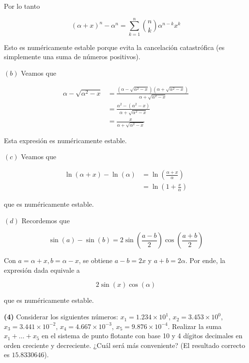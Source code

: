 \documentclass[12pt]{article}
\begin{document}
Por lo tanto 

\begin{equation*}
    (\alpha + x)^n - \alpha^n = \sum_{k=1}^{n} \binom{n}{k}\alpha^{n-k}x^k
\end{equation*}

Esto es numéricamente estable porque evita la cancelación catastrófica (es
simplemente una suma de números positivos).

$(b)$ Veamos que 

\begin{align*}
    \alpha - \sqrt{\alpha^2 - x}  
    &= \frac{( \alpha - \sqrt{\alpha^2 - x} )(\alpha + \sqrt{\alpha^2 - x})
    }{\alpha + \sqrt{\alpha^2 - x}} \\ 
    &= \frac{ \alpha^2 - ( \alpha^2 - x ) }{\alpha + \sqrt{\alpha^2 - x} } \\ 
    &= \frac{x}{\alpha + \sqrt{\alpha^2 - x} }
\end{align*}

Esta expresión es numéricamente estable.

$(c)$ Veamos que 

\begin{align*}
    \ln(\alpha + x) - \ln(\alpha) 
    &= \ln \left( \frac{\alpha+x}{\alpha} \right)  \\ 
    &= \ln \left( 1 + \frac{x}{\alpha} \right) 
\end{align*}

que es numéricamente estable. 

$(d)$ Recordemos que 

\begin{equation*}
    \sin(a) - \sin(b) = 2\sin\left( \frac{a-b}{2} \right) \cos \left(
    \frac{a+b}{2} \right) 
\end{equation*}

Con $a = \alpha + x, b = \alpha - x$, se obtiene $a - b = 2x$ y $a + b =
2\alpha$. Por ende, la expresión dada equivale a 

\begin{equation*}
    2 \sin(x) \cos(\alpha)
\end{equation*}

que es numéricamente estable.

\pagebreak 

\begin{myframe}
    
    \textbf{(4)} Considerar los siguientes números: $x_1 = 1.234 \times 10^1$,
    $x_2 = 3.453 \times 10^0$, $x_3 = 3.441 \times 10^{-2}$, $x_4 = 4.667 \times
    10^{-3}$, $x_5 = 9.876 \times 10^{-4}$. Realizar la suma $x_1 + \dots + x_5$
    en el sistema de punto flotante con base 10 y 4 dígitos decimales en orden
    creciente y decreciente. ¿Cuál será más conveniente? (El resultado correcto
    es $15.8330646$).
\end{myframe}
\end{document}
